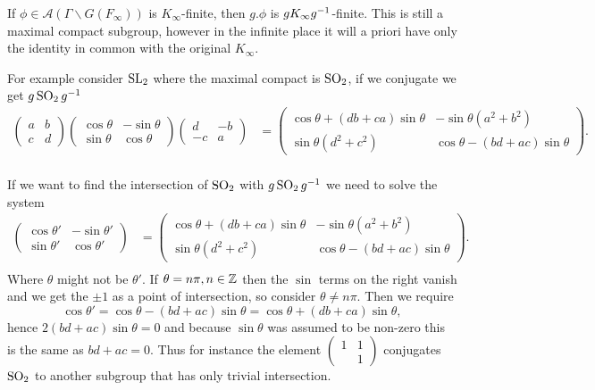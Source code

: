 \begin{example}
    If \(\phi\in \mathcal{A}(\Gamma \backslash G(F_\infty))\) is \(K_\infty\)-finite, then \(g.\phi\) is \(gK_\infty g^{-1}\)-finite. This is still a maximal compact subgroup, however in the infinite place it will a priori have only the identity in common with the original \(K_\infty\).

    For example consider \(\operatorname{SL}_2\) where the maximal compact is \(\operatorname{SO}_2\), if we conjugate we get \(g\operatorname{SO}_2g^{-1}\)
    \begin{align*}
        \begin{pmatrix}
            a & b\\
            c & d
        \end{pmatrix}
        \begin{pmatrix}
            \cos\theta & -\sin\theta \\
            \sin\theta & \cos\theta
        \end{pmatrix}
        \begin{pmatrix}
            d & -b\\
            -c & a
        \end{pmatrix}  &=  \begin{pmatrix}
            \cos\theta + (db  + ca)\sin\theta & -\sin\theta( a^2+b^2)\\
            \sin\theta(d^2 + c^2) & \cos\theta - (b d  + ac)\sin\theta
        \end{pmatrix}.\\
    \end{align*}

    If we want to find the intersection of \(\operatorname{SO}_2\) with \(g\operatorname{SO}_2 g^{-1}\) we need to solve the system 
    \begin{align*}
        \begin{pmatrix}
            \cos\theta' & -\sin\theta' \\
            \sin\theta' & \cos\theta'
        \end{pmatrix}  &=  \begin{pmatrix}
            \cos\theta + (db  + ca)\sin\theta & -\sin\theta( a^2+b^2)\\
            \sin\theta(d^2 + c^2) & \cos\theta - (b d  + ac)\sin\theta
        \end{pmatrix}.\\
    \end{align*}
    Where \(\theta\) might not be \(\theta'\). If \(\theta = n\pi, n\in \Z\) then the \(\sin\) terms on the right vanish and we get the \(\pm 1\) as a point of intersection, so consider \(\theta\neq n\pi\). Then we require 
    \[\cos\theta' = \cos\theta - (b d  + ac)\sin\theta = \cos\theta + (db  + ca)\sin\theta,\]
    hence \(2(bd+ac)\sin\theta = 0\) and because \(\sin\theta\) was assumed to be non-zero this is the same as \(bd+ac = 0\). Thus for instance the element \(\begin{pmatrix} 1 & 1\\ & 1  \end{pmatrix}\) conjugates \(\operatorname{SO}_2\) to another subgroup that has only trivial intersection. 


\end{example}
